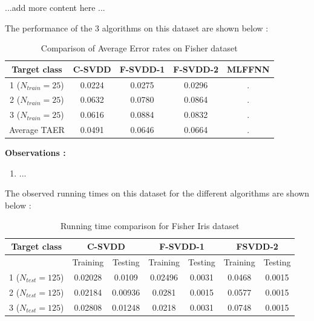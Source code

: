 \documentclass{article} %
\begin{document}
...add more content here ...

The performance of the 3 algorithms on this dataset are shown below :


\begin{table}[t]
\begin{center}
\caption{Comparison of Average Error rates on Fisher dataset}
\begin{tabular}{|c|c|c|c|c|}
\hline
Target class & C-SVDD & F-SVDD-1 & F-SVDD-2 & MLFFNN \\ \hline
1 ($N_{train} = 25$) &  0.0224  & 0.0275  & 0.0296  &. \\ \hline
2 ($N_{train} = 25$) &  0.0632  &  0.0780  & 0.0864  &. \\ \hline
3 ($N_{train} = 25$) & 0.0616  &  0.0884  & 0.0832 &. \\ \hline
Average TAER &  0.0491 & 0.0646 &  0.0664 &. \\ \hline

\end{tabular}
\end{center}
\end{table}


\textbf{Observations :}
\begin{enumerate}
\item ...
\end{enumerate}




The observed running times on this dataset for the different algorithms are shown below :

\begin{table}[t]
\begin{center}
\caption{Running time comparison for Fisher Iris dataset}
\begin{tabular}{|c|c|c|c|c|c|c|}
\hline
Target class & \multicolumn{2}{|c|}{C-SVDD} & \multicolumn{2}{|c|}{F-SVDD-1} & \multicolumn{2}{|c|}{FSVDD-2}  \\ \hline
& Training & Testing & Training & Testing & Training & Testing \\ \hline
1 ($N_{test} =125$)  & 0.02028 & 0.0109 & 0.02496  & 0.0031 & 0.0468 & 0.0015 \\ \hline
2 ($N_{test} =125$) & 0.02184 & 0.00936 & 0.0281  &  0.0015 & 0.0577 & 0.0015 \\ \hline
3 ($N_{test} =125$) &  0.02808 &  0.01248 & 0.0218  & 0.0031 & 0.0748 & 0.0015 \\ \hline

\end{tabular} \\[5pt]
\end{center}
\end{table}
\end{document}
